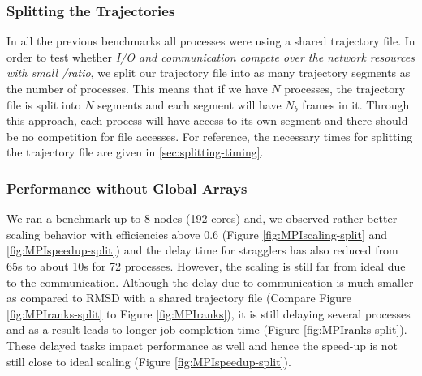 \subsubsection{Splitting the Trajectories}
\label{splitting-traj}
In all the previous benchmarks all processes were using a shared trajectory file.
In order to test whether \emph{I/O and communication compete over the network resources with small \tcomp/\tIO ratio}, we split our trajectory file into as many trajectory segments as the number of processes.
This means that if we have $N$ processes, the trajectory file is split into $N$ segments and each segment will have $N_{b}$ frames in it. 
Through this approach, each process will have access to its own segment and there should be no competition for file accesses. 
For reference, the necessary times for splitting the trajectory file are given in \ref{sec:splitting-timing}.

\subsubsection*{Performance without Global Arrays}
We ran a benchmark up to 8 nodes (192 cores) and, we observed rather better scaling behavior with efficiencies above 0.6 (Figure \ref{fig:MPIscaling-split} and \ref{fig:MPIspeedup-split}) and the delay time for stragglers has also reduced from 65s to about 10s for 72 processes. 
However, the scaling is still far from ideal due to the communication. 
Although the delay due to communication is much smaller as compared to RMSD with a shared trajectory file (Compare Figure \ref{fig:MPIranks-split} to Figure \ref{fig:MPIranks}), it is still delaying several processes and as a result leads to longer job completion time (Figure \ref{fig:MPIranks-split}). 
These delayed tasks impact performance as well and hence the speed-up is not still close to ideal scaling (Figure \ref{fig:MPIspeedup-split}).

